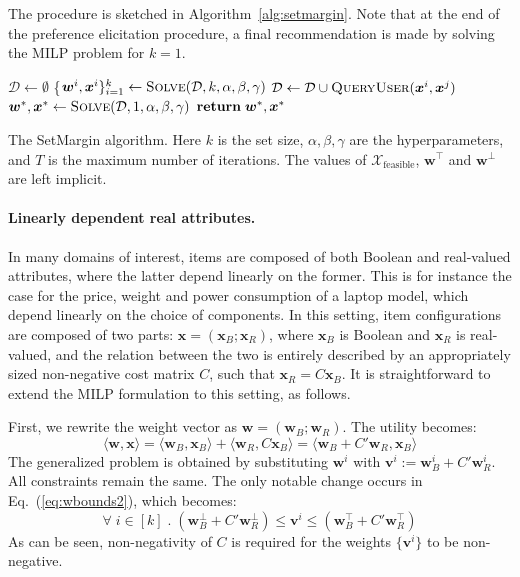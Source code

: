 \documentclass{article}
\renewcommand\[{\begin{equation}}
\renewcommand\]{\end{equation}}
\newcommand{\calvar}[1]{\ensuremath{\mathcal{#1}}}
\newcommand{\calD}{\calvar{D}}
\newcommand{\calX}{\calvar{X}}
\newcommand{\vecvar}[1]{\ensuremath{\boldsymbol{#1}}}
\newcommand{\vv}{\vecvar{v}}
\newcommand{\vw}{\vecvar{w}}
\newcommand{\vx}{\vecvar{x}}
\begin{document}
The procedure is sketched in
Algorithm~\ref{alg:setmargin}. Note that at the end of the preference
elicitation procedure, a final recommendation is made by solving the
MILP problem for $k=1$.

\begin{algorithm}
{\footnotesize
\begin{algorithmic}[1]
        \State $\calD \gets \emptyset$
            \State \{$\vw^{i}, \vx^{i}\}_{i=1}^k \gets \text{{\sc Solve}}(\calD, k, \alpha, \beta, \gamma)$
            \For{$\vx^{i},\vx^{j} \in \{ \vx^{1}, \ldots, \vx^{k} \} \; \text{{\bf s.t.}} \; i < j$}
                \State $\calD \gets \calD \cup \text{{\sc QueryUser}}(\vx^{i},\vx^{j})$
            \EndFor
        \EndFor
        \State $\vw^*, \vx^* \gets \text{{\sc Solve}}(\calD, 1, \alpha, \beta, \gamma)$
        \State ${\bf return}\; \vw^*, \vx^*$
    \EndProcedure
\end{algorithmic}
}
\caption{\label{alg:setmargin} The {\sc SetMargin} algorithm. Here $k$ is the
set size, $\alpha,\beta,\gamma$ are the hyperparameters, and $T$ is the maximum
number of iterations. The values of $\calX_\text{feasible}$, $\vw^\top$ and
$\vw^\bot$ are left implicit.}
\end{algorithm}

\paragraph{Linearly dependent real attributes.} In many domains of interest,
items are composed of both Boolean and real-valued attributes, where the latter
depend linearly  on the former. This is for instance the case for the price,
weight and power consumption of a laptop model, which depend linearly on the
choice of components.
%
In this setting, item configurations are composed of two parts: $\vx =
(\vx_B;\vx_R)$, where $\vx_B$ is Boolean and $\vx_R$ is real-valued, and the
relation between the two is entirely described by an appropriately sized
non-negative cost matrix $C$, such that $\vx_R = C \vx_B$. It is
straightforward to extend the MILP formulation to this setting, as follows.

First, we rewrite the weight vector as $\vw = (\vw_B;\vw_R)$. The utility
becomes:
%
$$ \langle \vw, \vx \rangle = \langle \vw_B, \vx_B \rangle + \langle \vw_R, C \vx_B \rangle = \langle \vw_B + C' \vw_R, \vx_B \rangle $$
%
The generalized problem is obtained by substituting $\vw^i$ with $\vv^i :=
\vw_B^i + C' \vw_R^i$.  All constraints remain the same. The only notable
change occurs in Eq.~(\ref{eq:wbounds2}), which becomes:
%
$$ \forall \; i \in [k] \;.\; (\vw_B^\bot + C' \vw_R^\bot) \le \vv^i \le (\vw_B^\top + C' \vw_R^\top)$$
%
As can be seen, non-negativity of $C$ is required for the weights $\{\vv^i\}$
to be non-negative.
\end{document}
